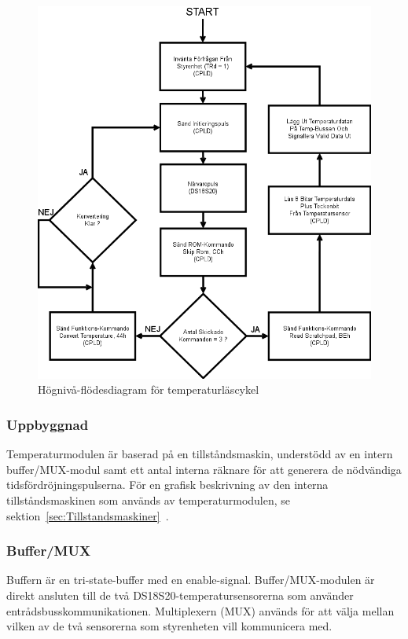 \documentclass[a4paper,11pt]{article}
\begin{document}
		\begin{figure}[H]
		  \centering
		      \includegraphics[scale=0.5, angle=0]{ReadCycleFlowChart.png}
		  	\caption{Högnivå-flödesdiagram för temperaturläscykel}
			\label{fig:RCFlowChart}
		\end{figure}

	\subsubsection{Uppbyggnad}

	Temperaturmodulen är baserad på en tillståndsmaskin, understödd av en intern buffer/MUX-modul samt 
	ett antal interna räknare för att generera de nödvändiga tidsfördröjningspulserna. För en grafisk beskrivning av den interna tillståndsmaskinen som används av temperaturmodulen,
	se sektion~\ref{sec:Tillstandsmaskiner}~.

	\subsubsection{Buffer/MUX}

	Buffern är en tri-state-buffer med en enable-signal.
	Buffer/MUX-modulen är direkt ansluten till de två DS18S20-temperatursensorerna som använder entrådsbusskommunikationen.
	Multiplexern (MUX) används för att välja mellan vilken av de två sensorerna som styrenheten vill kommunicera med.
\end{document}
